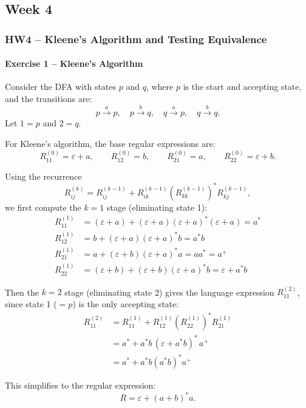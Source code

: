 \documentclass[11pt, a4paper]{article}
\theoremstyle{definition}
\theoremstyle{remark}
\begin{document}
\subsection{Week 4}
\subsubsection*{HW4 -- Kleene's Algorithm and Testing Equivalence}

\paragraph{Exercise 1 -- Kleene's Algorithm}

Consider the DFA with states $p$ and $q$, where $p$ is the start and accepting state, and the transitions are:
\[
p \xrightarrow{a} p,\quad p \xrightarrow{b} q,\quad q \xrightarrow{a} p,\quad q \xrightarrow{b} q.
\]
Let $1=p$ and $2=q$.

For Kleene's algorithm, the base regular expressions are:
\[
R_{11}^{(0)}=\varepsilon + a,\qquad
R_{12}^{(0)}=b,\qquad
R_{21}^{(0)}=a,\qquad
R_{22}^{(0)}=\varepsilon + b.
\]

Using the recurrence
\[
R_{ij}^{(k)} = R_{ij}^{(k-1)} + R_{ik}^{(k-1)}\left(R_{kk}^{(k-1)}\right)^*R_{kj}^{(k-1)},
\]
we first compute the $k=1$ stage (eliminating state 1):
\begin{align*}
R_{11}^{(1)} &= (\varepsilon + a) + (\varepsilon + a)(\varepsilon + a)^*(\varepsilon + a) = a^* \\
R_{12}^{(1)} &= b + (\varepsilon + a)(\varepsilon + a)^* b = a^*b \\
R_{21}^{(1)} &= a + (\varepsilon + b)(\varepsilon + a)^* a = aa^* = a^+ \\
R_{22}^{(1)} &= (\varepsilon + b) + (\varepsilon + b)(\varepsilon + a)^* b = \varepsilon + a^*b
\end{align*}

Then the $k=2$ stage (eliminating state 2) gives the language expression $R_{11}^{(2)}$, since state 1 ($=p$) is the only accepting state:
\begin{align*}
R_{11}^{(2)} &= R_{11}^{(1)} + R_{12}^{(1)}\left(R_{22}^{(1)}\right)^* R_{21}^{(1)} \\
             &= a^* + a^*b\,(\varepsilon + a^*b)^*\,a^+ \\
             &= a^* + a^*b(a^*b)^*a^+
\end{align*}

This simplifies to the regular expression:
\[
R = \varepsilon + (a+b)^*a.
\]
\end{document}
